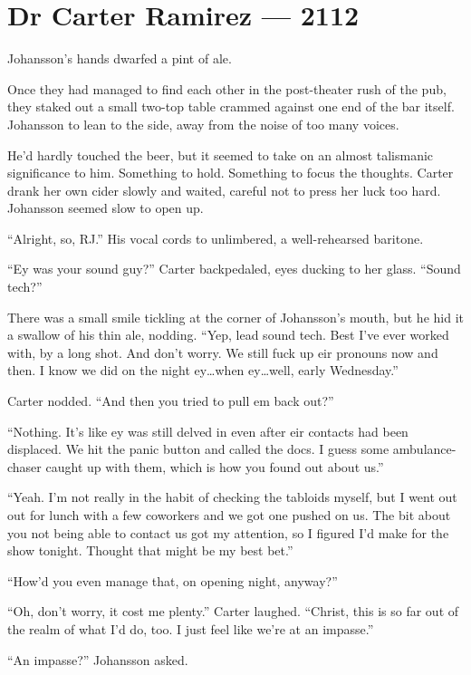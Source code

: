 \hypertarget{dr-carter-ramirez-2112}{%
\chapter*{Dr Carter Ramirez — 2112}\label{dr-carter-ramirez-2112}}

Johansson's hands dwarfed a pint of ale.

Once they had managed to find each other in the post-theater rush of the pub, they staked out a small two-top table crammed against one end of the bar itself. Johansson to lean to the side, away from the noise of too many voices.

He'd hardly touched the beer, but it seemed to take on an almost talismanic significance to him. Something to hold. Something to focus the thoughts. Carter drank her own cider slowly and waited, careful not to press her luck too hard. Johansson seemed slow to open up.

``Alright, so, RJ.'' His vocal cords to unlimbered, a well-rehearsed baritone.

``Ey was your sound guy?'' Carter backpedaled, eyes ducking to her glass. ``Sound tech?''

There was a small smile tickling at the corner of Johansson's mouth, but he hid it a swallow of his thin ale, nodding. ``Yep, lead sound tech. Best I've ever worked with, by a long shot. And don't worry. We still fuck up eir pronouns now and then. I know we did on the night ey\ldots{}when ey\ldots{}well, early Wednesday.''

Carter nodded. ``And then you tried to pull em back out?''

``Nothing. It's like ey was still delved in even after eir contacts had been displaced. We hit the panic button and called the docs. I guess some ambulance-chaser caught up with them, which is how you found out about us.''

``Yeah. I'm not really in the habit of checking the tabloids myself, but I went out out for lunch with a few coworkers and we got one pushed on us. The bit about you not being able to contact us got my attention, so I figured I'd make for the show tonight. Thought that might be my best bet.''

``How'd you even manage that, on opening night, anyway?''

``Oh, don't worry, it cost me plenty.'' Carter laughed. ``Christ, this is so far out of the realm of what I'd do, too. I just feel like we're at an impasse.''

``An impasse?'' Johansson asked.

